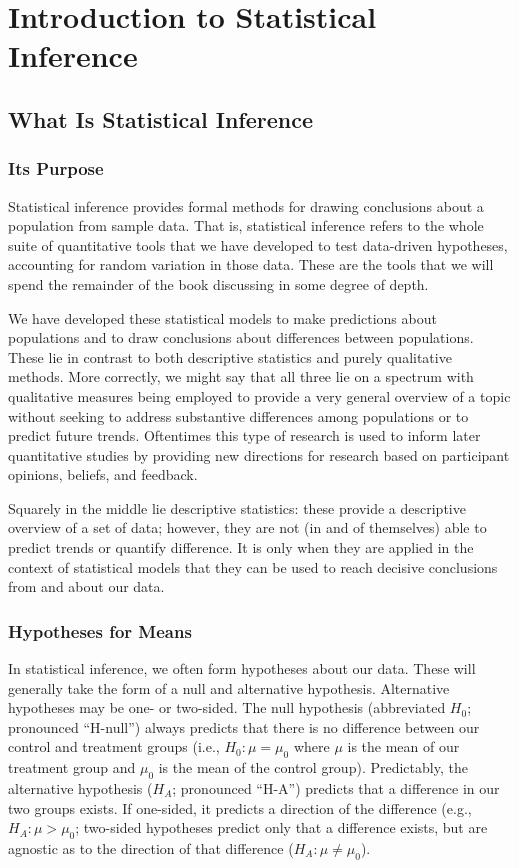 
\chapter{Introduction to Statistical Inference}

\section{What Is Statistical Inference}

\subsection{Its Purpose}
Statistical inference provides formal methods for drawing conclusions about a population from sample data. That is, statistical inference refers to the whole suite of quantitative tools that we have developed to test data-driven hypotheses, accounting for random variation in those data. These are the tools that we will spend the remainder of the book discussing in some degree of depth.

We have developed these statistical models to make predictions about populations and to draw conclusions about differences between populations. These lie in contrast to both descriptive statistics and purely qualitative methods. More correctly, we might say that all three lie on a spectrum with qualitative measures being employed to provide a very general overview of a topic without seeking to address substantive differences among populations or to predict future trends. Oftentimes this type of research is used to inform later quantitative studies by providing new directions for research based on participant opinions, beliefs, and feedback.

Squarely in the middle lie descriptive statistics: these provide a descriptive overview of a set of data; however, they are not (in and of themselves) able to predict trends or quantify difference. It is only when they are applied in the context of statistical models that they can be used to reach decisive conclusions from and about our data.

\subsection{Hypotheses for Means}
In statistical inference, we often form hypotheses about our data. These will generally take the form of a null and alternative hypothesis. Alternative hypotheses may be one- or two-sided. The null hypothesis (abbreviated \(H_0\); pronounced ``H-null'') always predicts that there is no difference between our control and treatment groups (i.e., \(H_0: \mu=\mu_0\) where \(\mu\) is the mean of our treatment group and \(\mu_0\) is the mean of the control group). Predictably, the alternative hypothesis (\(H_A\); pronounced ``H-A'') predicts that a difference in our two groups exists. If one-sided, it predicts a direction of the difference (e.g., \(H_A: \mu > \mu_0\); two-sided hypotheses predict only that a difference exists, but are agnostic as to the direction of that difference (\(H_A: \mu \neq \mu_0\)).

